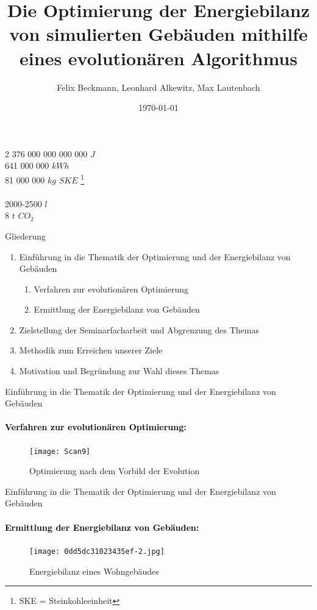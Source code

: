 \documentclass[11pt]{beamer}
\author{Felix Beckmann, Leonhard Alkewitz, Max Lautenbach}
\title{Die Optimierung der Energiebilanz von simulierten Gebäuden mithilfe eines evolutionären Algorithmus}
\institute{Spezialschulteil des Albert-Schweizer Gymnasium Erfurt}
\date{\today}
\begin{document}
\begin{frame}

\end{frame}

\begin{frame}
\begin{center}
\huge{2 376 000 000 000 000 $J$}  \\  
\pause \huge{641 000 000 $kWh$} \\ 
\pause \huge{81 000 000 $kg$ $SKE$ \footnote{SKE = Steinkohleeinheit}} \\ 
\hrulefill{}  \\
\pause \huge{2000-2500 $l$} \\ 
\pause \huge{8 $t$ $CO_2$}
\end{center}
\end{frame}

\begin{frame}
\titlepage
\end{frame}

\begin{frame}{Gliederung}
\begin{enumerate}
\item{Einführung in die Thematik der Optimierung und der Energiebilanz von Gebäuden}
\begin{enumerate}
\item{Verfahren zur evolutionären Optimierung}
\item{Ermittlung der Energiebilanz von Gebäuden}
\end{enumerate}
\item{Zielstellung der Seminarfacharbeit und Abgrenzung des Themas}
\item{Methodik zum Erreichen unserer Ziele}
\item{Motivation und Begründung zur Wahl dieses Themas}
\end{enumerate}
\end{frame}

\begin{frame}{Einführung in die Thematik der Optimierung und der Energiebilanz von Gebäuden}
\framesubtitle{\large{\textcolor{black}{Verfahren zur evolutionären Optimierung:}}}
\begin{figure}
\texttt{[image: Scan9]}
\caption{Optimierung nach dem Vorbild der Evolution}
\end{figure}
\end{frame}

\begin{frame}{Einführung in die Thematik der Optimierung und der Energiebilanz von Gebäuden}
\framesubtitle{\large{\textcolor{black}{Ermittlung der Energiebilanz von Gebäuden:}}}
\begin{figure}
\texttt{[image: 0dd5dc31023435ef-2.jpg]} 
\caption{Energiebilanz eines Wohngebäudes}
\end{figure}
\end{frame}
\end{document}
